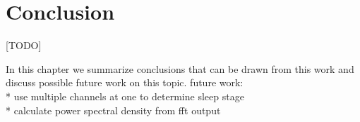 \chapter{Conclusion}
\label{chapter:conclusion}

[TODO]

In this chapter we summarize conclusions that can be drawn from this work and discuss possible future work on this topic.
\newline
\newline
future work:\\
* use multiple channels at one to determine sleep stage\\
* calculate power spectral density from fft output